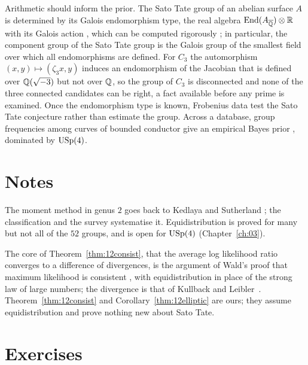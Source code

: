 Arithmetic should inform the prior. The Sato Tate group of an abelian surface $A$ is determined by its Galois endomorphism type, the real algebra $\mathrm{End}(A_{\overline{\mathbb{Q}}})\otimes\mathbb{R}$ with its Galois action \cite{fkrs2012}, which can be computed rigorously \cite{cmsv2019}; in particular, the component group of the Sato Tate group is the Galois group of the smallest field over which all endomorphisms are defined. For $C_3$ the automorphism $(x,y)\mapsto(\zeta_3x,y)$ induces an endomorphism of the Jacobian that is defined over $\mathbb{Q}(\sqrt{-3})$ but not over $\mathbb{Q}$, so the group of $C_3$ is disconnected and none of the three connected candidates can be right, a fact available before any prime is examined. Once the endomorphism type is known, Frobenius data test the Sato Tate conjecture rather than estimate the group. Across a database, group frequencies among curves of bounded conductor give an empirical Bayes prior \cite{robbins1956}, dominated by $\mathrm{USp}(4)$.

\section{Notes}

The moment method in genus $2$ goes back to Kedlaya and Sutherland \cite{kedlayasutherland2009}; the classification \cite{fkrs2012} and the survey \cite{sutherland2019} systematise it. Equidistribution is proved for many but not all of the $52$ groups, and is open for $\mathrm{USp}(4)$ (Chapter~\ref{ch:03}).

The core of Theorem~\ref{thm:12consist}, that the average log likelihood ratio converges to a difference of divergences, is the argument of Wald's proof that maximum likelihood is consistent \cite{wald1949}, with equidistribution in place of the strong law of large numbers; the divergence is that of Kullback and Leibler~\cite{kullbackleibler1951}. Theorem~\ref{thm:12consist} and Corollary~\ref{thm:12elliptic} are ours; they assume equidistribution and prove nothing new about Sato Tate.

\section{Exercises}

